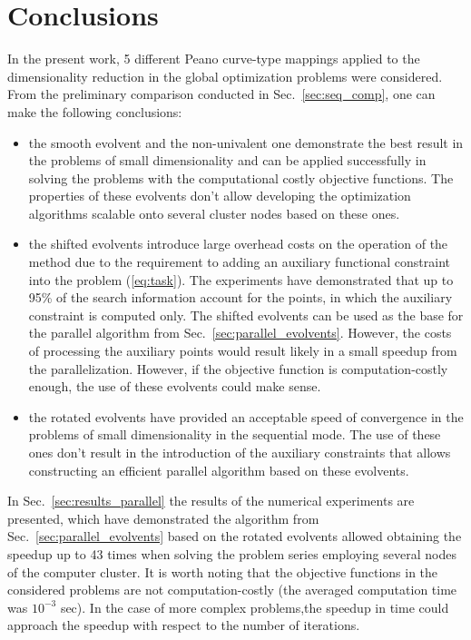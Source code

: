 \documentclass[runningheads]{llncs}
\begin{document}
\section{Conclusions}
In the present work, 5 different Peano curve-type mappings applied to the dimensionality
reduction in the global optimization problems were considered.
From the preliminary comparison conducted in Sec.~\ref{sec:seq_comp}, one can make the
following conclusions:
\begin{itemize}
  \item the smooth evolvent and the non-univalent one demonstrate the best result in the
problems of small dimensionality and can be applied successfully in solving the problems with
the computational costly objective functions. The properties of these evolvents don't allow
developing the optimization algorithms scalable onto several cluster nodes based on these ones.
  \item the shifted evolvents introduce large overhead costs on the operation of the method due
to the requirement to adding an auxiliary functional constraint into the problem (\ref{eq:task}).
The experiments have demonstrated that up to 95\% of the search information account for the
points, in which the auxiliary constraint is computed only. The shifted evolvents can be used as
the base for the parallel algorithm from Sec.~\ref{sec:parallel_evolvents}. However, the costs of
processing the auxiliary points would result likely in a small speedup from the parallelization.
However, if the objective function is computation-costly enough, the use of these evolvents
could make sense.
  \item the rotated evolvents have provided an acceptable speed of convergence in the problems
of small dimensionality in the sequential mode. The use of these ones don't result in the
introduction of the auxiliary constraints that allows constructing an efficient parallel algorithm
based on these evolvents.
\end{itemize}

In Sec.~\ref{sec:results_parallel} the results of the numerical experiments are presented, which
have demonstrated the algorithm from Sec.~\ref{sec:parallel_evolvents} based on the rotated
evolvents allowed obtaining the speedup up to 43 times when solving the problem series
employing several nodes of the computer cluster. It is worth noting that the objective functions
in the considered problems are not computation-costly (the averaged computation time was
$10^{-3}$ sec). In the case of more complex problems,the speedup in time could approach the
speedup with respect to the number of iterations.
\end{document}
